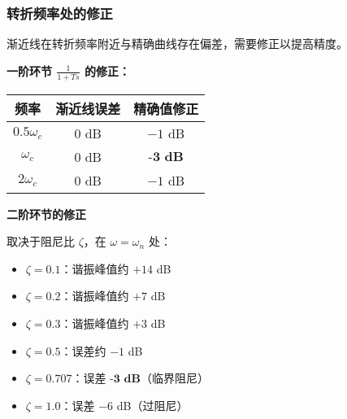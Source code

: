 \subsubsection{转折频率处的修正}

渐近线在转折频率附近与精确曲线存在偏差，需要修正以提高精度。

\begin{minipage}[t]{0.48\textwidth}
\textbf{一阶环节 $\frac{1}{1+Ts}$ 的修正：}

\begin{center}
\begin{tabular}{c|c|c}
\hline
频率 & 渐近线误差 & 精确值修正 \\
\hline
$0.5\omega_c$ & $0$ dB & $-1$ dB \\
$\omega_c$ & $0$ dB & $\textbf{-3 dB}$ \\
$2\omega_c$ & $0$ dB & $-1$ dB \\
\hline
\end{tabular}
\end{center}

\vspace{0.3cm}
\textbf{二阶环节的修正}

取决于阻尼比 $\zeta$，在 $\omega = \omega_n$ 处：
\begin{itemize}
    \item $\zeta = 0.1$：谐振峰值约 $+14$ dB
    \item $\zeta = 0.2$：谐振峰值约 $+7$ dB
    \item $\zeta = 0.3$：谐振峰值约 $+3$ dB
    \item $\zeta = 0.5$：误差约 $-1$ dB
    \item $\zeta = 0.707$：误差 $\textbf{-3 dB}$（临界阻尼）
    \item $\zeta = 1.0$：误差 $-6$ dB（过阻尼）
\end{itemize}
\end{minipage}\hfill
